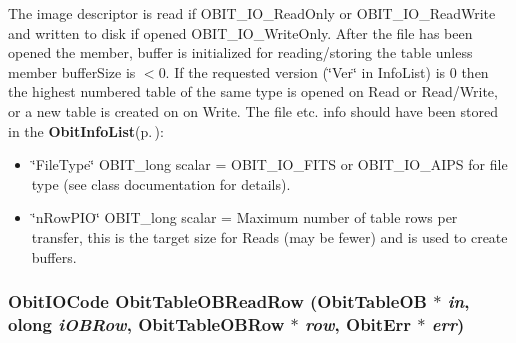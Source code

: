 The image descriptor is read if OBIT\_\-IO\_\-Read\-Only or OBIT\_\-IO\_\-Read\-Write and written to disk if opened OBIT\_\-IO\_\-Write\-Only. After the file has been opened the member, buffer is initialized for reading/storing the table unless member buffer\-Size is $<$0. If the requested version (\char`\"{}Ver\char`\"{} in Info\-List) is 0 then the highest numbered table of the same type is opened on Read or Read/Write, or a new table is created on on Write. The file etc. info should have been stored in the {\bf Obit\-Info\-List}{\rm (p.\,\pageref{structObitInfoList})}: \begin{itemize}
\item \char`\"{}File\-Type\char`\"{} OBIT\_\-long scalar = OBIT\_\-IO\_\-FITS or OBIT\_\-IO\_\-AIPS for file type (see class documentation for details). \item \char`\"{}n\-Row\-PIO\char`\"{} OBIT\_\-long scalar = Maximum number of table rows per transfer, this is the target size for Reads (may be fewer) and is used to create buffers. 
\end{itemize}
\subsubsection{\setlength{\rightskip}{0pt plus 5cm}Obit\-IOCode Obit\-Table\-OBRead\-Row ({\bf Obit\-Table\-OB} $\ast$ {\em in}, {\bf olong} {\em i\-OBRow}, {\bf Obit\-Table\-OBRow} $\ast$ {\em row}, {\bf Obit\-Err} $\ast$ {\em err})}\label{ObitTableOB_8h_a18}


